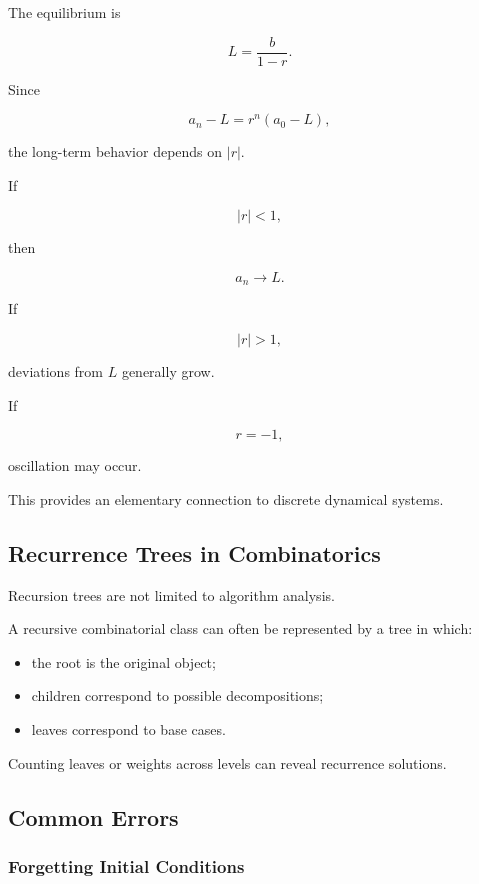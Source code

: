 The equilibrium is

\[
L=\frac{b}{1-r}.
\]

Since

\[
a_n-L
=
r^n(a_0-L),
\]

the long-term behavior depends on \(|r|\).

If

\[
|r|<1,
\]

then

\[
a_n\to L.
\]

If

\[
|r|>1,
\]

deviations from \(L\) generally grow.

If

\[
r=-1,
\]

oscillation may occur.

This provides an elementary connection to discrete dynamical systems.

\subsection{Recurrence Trees in Combinatorics}
\label{subsec:recurrence-trees-combinatorics}

Recursion trees are not limited to algorithm analysis.

A recursive combinatorial class can often be represented by a tree in
which:

\begin{itemize}
    \item the root is the original object;
    \item children correspond to possible decompositions;
    \item leaves correspond to base cases.
\end{itemize}

Counting leaves or weights across levels can reveal recurrence
solutions.

\subsection{Common Errors}
\label{subsec:recurrence-common-errors}

\subsubsection{Forgetting Initial Conditions}


